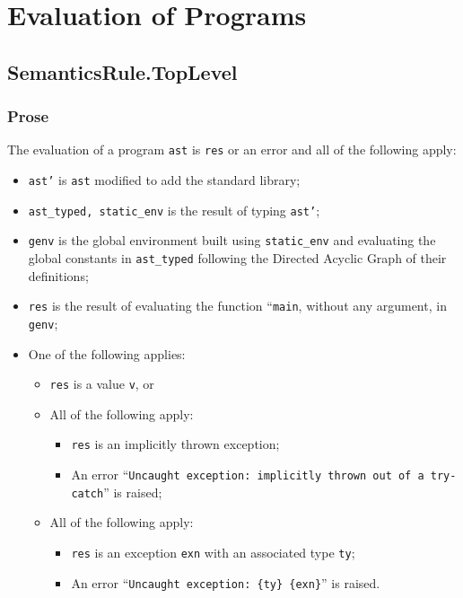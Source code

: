\documentclass{book}
\begin{document}
\chapter{Evaluation of Programs}

  \section{SemanticsRule.TopLevel \label{sec:SemanticsRule.TopLevel}}

  \subsection{Prose}
  The evaluation of a program \texttt{ast} is \texttt{res} or an error
  and all of the following apply:
  \begin{itemize}
  \item \texttt{ast’} is \texttt{ast} modified to add the standard library;
  \item \texttt{ast\_typed, static\_env} is the result of typing \texttt{ast’};
  \item \texttt{genv} is the global environment built using \texttt{static\_env} and evaluating the global constants in \texttt{ast\_typed} following the Directed Acyclic Graph of their definitions;
  \item \texttt{res} is the result of evaluating the function ``\texttt{main}, without any argument, in \texttt{genv};
  \item One of the following applies:
        \begin{itemize}
	\item \texttt{res} is a value \texttt{v}, or
	\item All of the following apply:
              \begin{itemize}
              \item \texttt{res} is an implicitly thrown exception;
	      \item An error ``\texttt{Uncaught exception: implicitly thrown out of a try-catch}'' is raised;
              \end{itemize}
	\item All of the following apply:
              \begin{itemize}
              \item \texttt{res} is an exception \texttt{exn} with an associated type \texttt{ty};
	      \item An error ``\texttt{Uncaught exception: \{ty\} \{exn\}}'' is raised.
              \end{itemize}
        \end{itemize}
  \end{itemize}
\end{document}
